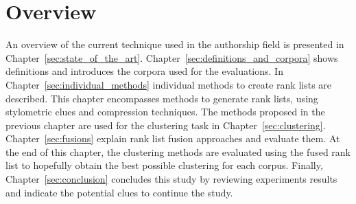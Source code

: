 \section{Overview}

An overview of the current technique used in the authorship field is presented in Chapter~\ref{sec:state_of_the_art}.
Chapter~\ref{sec:definitions_and_corpora} shows definitions and introduces the corpora used for the evaluations.
In Chapter~\ref{sec:individual_methods} individual methods to create rank lists are described.
This chapter encompasses methods to generate rank lists, using stylometric clues and compression techniques.
The methods proposed in the previous chapter are used for the clustering task in Chapter~\ref{sec:clustering}.
Chapter~\ref{sec:fusions} explain rank list fusion approaches and evaluate them.
At the end of this chapter, the clustering methods are evaluated using the fused rank list to hopefully obtain the best possible clustering for each corpus.
Finally, Chapter~\ref{sec:conclusion} concludes this study by reviewing experiments results and indicate the potential clues to continue the study.
